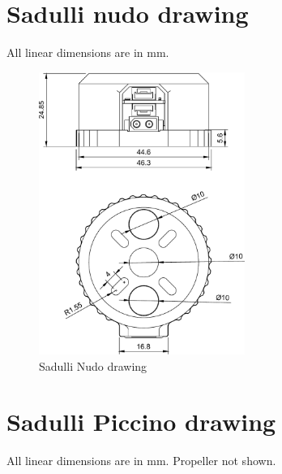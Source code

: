 \newpage

\section{Sadulli nudo drawing}
All linear dimensions are in mm.

\begin{figure}[!hbt]
    \centerline{\includegraphics[width=0.6\textwidth]{figures/sadulli_nudo}}
    \caption{Sadulli Nudo drawing}
\end{figure}

\newpage

\section{Sadulli Piccino drawing}
All linear dimensions are in mm. Propeller not shown.

